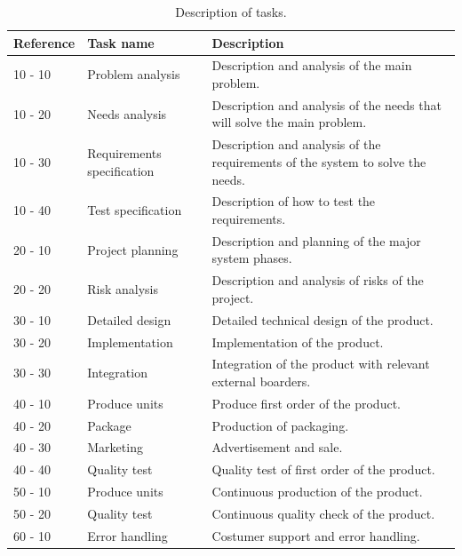\begin{table}[H]
\begin{tabular}{|l|l|p{9cm}|}
\hline
\textbf{Reference} & \textbf{Task name} & \textbf{Description} \\ \hline
10 - 10 & Problem analysis & Description and analysis of the main problem. 
\\  \hline
10 - 20 & Needs analysis & Description and analysis of the needs that will solve the main problem. 
\\  \hline
10 - 30 & Requirements specification & Description and analysis of the requirements of the system to solve the needs. 
\\  \hline 
10 - 40 & Test specification & Description of how to test the requirements.
\\  \hline
20 - 10 & Project planning & Description and planning of the major system phases.
\\  \hline 
20 - 20 & Risk analysis & Description and analysis of risks of the project.
\\ \hline
30 - 10 & Detailed design & Detailed technical design of the product.
\\  \hline
30 - 20 & Implementation & Implementation of the product. 
\\  \hline
30 - 30 & Integration & Integration of the product with relevant external boarders. 
\\  \hline 
40 - 10 & Produce units & Produce first order of the product.
\\  \hline 
40 - 20 & Package & Production of packaging.
\\  \hline 
40 - 30 & Marketing & Advertisement and sale.
\\  \hline 
40 - 40 & Quality test & Quality test of first order of the product.
\\  \hline 
50 - 10 & Produce units & Continuous production of the product.
\\  \hline 
50 - 20 & Quality test & Continuous quality check of the product.
\\  \hline 
60 - 10 & Error handling & Costumer support and error handling.
\\  \hline 
\end{tabular}
\caption{Description of tasks.}
\end{table}